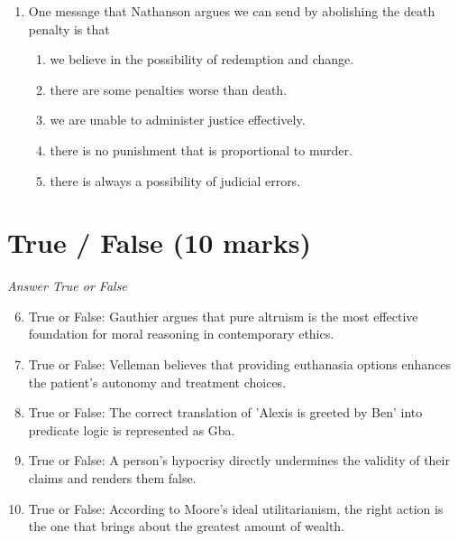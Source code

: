 \documentclass[12pt]{article}
\begin{document}
\begin{enumerate}[label=\arabic*.]
\begin{enumerate}[label=(\alph*)]
    \item the false dilemma fallacy.
    \item the appeal to authority fallacy.
    \item the straw man fallacy.
    \item the naturalistic fallacy.
    \item the ad hominem fallacy.
\end{enumerate}
\item One message that Nathanson argues we can send by abolishing the death penalty is that
\begin{enumerate}[label=(\alph*)]
    \item we believe in the possibility of redemption and change.
    \item there are some penalties worse than death.
    \item we are unable to administer justice effectively.
    \item there is no punishment that is proportional to murder.
    \item there is always a possibility of judicial errors.
\end{enumerate}
\end{enumerate}

\section*{True / False (10 marks)}
\textit{Answer True or False}
\begin{enumerate}[label=\arabic*.]
\setcounter{enumi}{5}
\item True or False: Gauthier argues that pure altruism is the most effective foundation for moral reasoning in contemporary ethics.
\item True or False: Velleman believes that providing euthanasia options enhances the patient's autonomy and treatment choices.
\item True or False: The correct translation of 'Alexis is greeted by Ben' into predicate logic is represented as Gba.
\item True or False: A person's hypocrisy directly undermines the validity of their claims and renders them false.
\item True or False: According to Moore's ideal utilitarianism, the right action is the one that brings about the greatest amount of wealth.
\end{enumerate}
\end{document}

